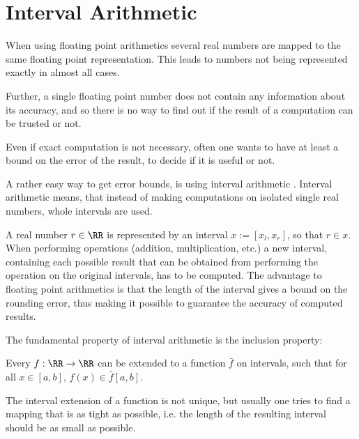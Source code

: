 \section{Interval Arithmetic}
	When using floating point arithmetics several real numbers are mapped to the
  same floating point representation. 
  This leads to numbers not being represented exactly in almost all cases.

	Further, a single floating point number does not contain any information
  about its accuracy, and so there is no way to find out if the result of a
  computation can be trusted or not.

  Even if exact computation is not necessary, often one wants to have at least
  a bound on the error of the result, to decide if it is useful or not.
    
  A rather easy way to get error bounds, is using interval arithmetic
  \cite{Kearfott1996}.
  Interval arithmetic means, that instead of making computations on isolated single real numbers, whole
  intervals are used.

	A real number $r \in \RR$ is represented by an interval $x := [x_l,x_r]$, so that $r \in x$.
  When performing operations (addition, multiplication, etc.) a new interval,
  containing each possible result that can be obtained from performing the
  operation on the original intervals, has to be computed.
	The advantage to floating point arithmetics is that the length of the interval gives a bound on the rounding error, 
	thus making it possible to guarantee the accuracy of computed results.

	The fundamental property of interval arithmetic is the inclusion property:

	Every $f: \RR \to \RR$ can be extended to a function $\bar f$ on intervals, such that for all $x \in [a,b]$, $f(x) \in \bar f[a,b]$. 

	The interval extension of a function is not unique, but usually one tries to
  find a mapping that is as tight as possible, i.e. the length of the resulting interval
  should be as small as possible.
  
